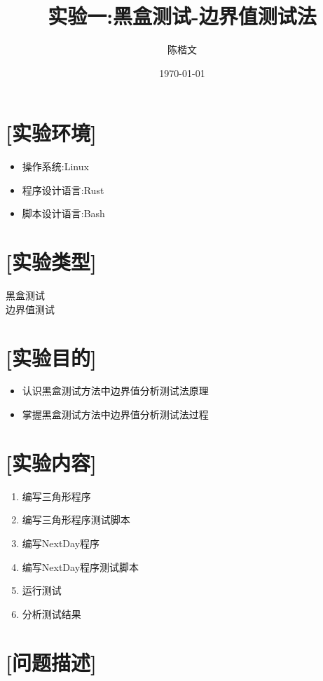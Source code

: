 \documentclass{article}
\begin{document}


\title{实验一:黑盒测试-边界值测试法}
\author{陈楷文}
\date{\today}

\maketitle

\section{[实验环境]}
\begin{itemize}
    \item 操作系统:Linux
    \item 程序设计语言:Rust
    \item 脚本设计语言:Bash
\end{itemize}
\section{[实验类型]}

黑盒测试 \\
边界值测试 \\

\section{[实验目的]}
\begin{itemize}
    \item 认识黑盒测试方法中边界值分析测试法原理
    \item 掌握黑盒测试方法中边界值分析测试法过程
\end{itemize}

\section{[实验内容]}
\begin{enumerate}
    \item 编写三角形程序
    \item 编写三角形程序测试脚本
    \item 编写NextDay程序
    \item 编写NextDay程序测试脚本
    \item 运行测试
    \item 分析测试结果
\end{enumerate}
\section{[问题描述]}
\end{document}
